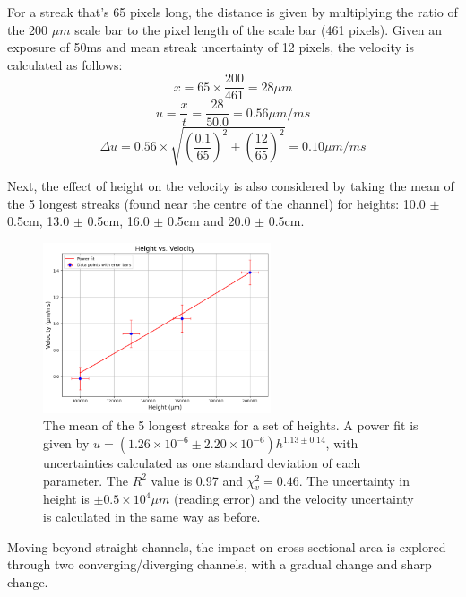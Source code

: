 \documentclass[12pt]{article}
\begin{document}
For a streak that's 65 pixels long, the distance is given by multiplying the ratio of the 200 $\mu m$ scale bar to the pixel length of the scale bar (461 pixels). Given an exposure of 50ms and mean streak uncertainty of 12 pixels, the velocity is calculated as follows:
$$x = 65 \times \frac{200}{461} = 28 \mu m$$
$$u = \frac{x}{t} = \frac{28}{50.0} = 0.56\mu m/ms$$
$$\Delta u = 0.56 \times \sqrt{(\frac{0.1}{65})^2 + (\frac{12}{65})^2} = 0.10\mu m/ms$$

Next, the effect of height on the velocity is also considered by taking the mean of the 5 longest streaks (found near the centre of the channel) for heights: 10.0 $\pm$ 0.5cm, 13.0 $\pm$ 0.5cm, 16.0 $\pm$ 0.5cm and 20.0 $\pm$ 0.5cm.

\begin{figure}[H]
    \centering
    \includegraphics[width=0.6\textwidth]{img/height.png}
    \caption{The mean of the 5 longest streaks for a set of heights. A power fit is given by $u = (1.26\times10^{-6} \pm 2.20\times10^{-6})h^{1.13 \pm 0.14}$, with uncertainties calculated as one standard deviation of each parameter. The $R^2$ value is 0.97 and $\chi_v^2=0.46$. The uncertainty in height is $\pm 0.5 \times 10^{4} \mu m$ (reading error) and the velocity uncertainty is calculated in the same way as before.}
    \label{fig:height_vs_velocity}
\end{figure}

Moving beyond straight channels, the impact on cross-sectional area is explored through two converging/diverging channels, with a gradual change and sharp change.
\end{document}
